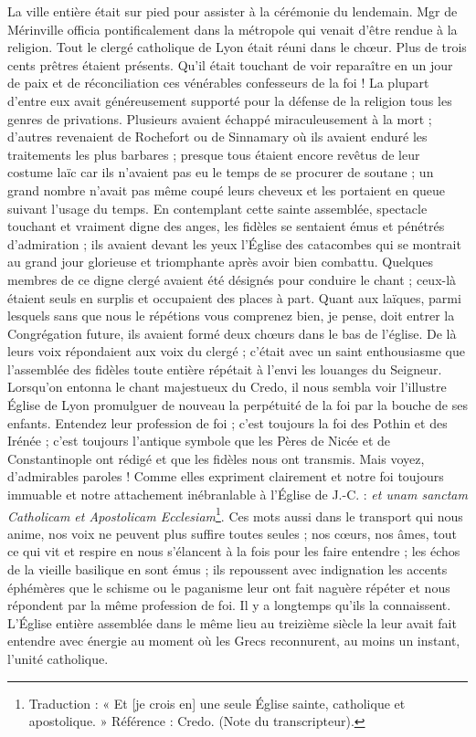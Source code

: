 La ville entière était sur pied pour assister à la cérémonie du lendemain. Mgr de Mérinville officia pontificalement dans la métropole qui venait d'être rendue à la religion. Tout le clergé catholique de Lyon était réuni dans le chœur. Plus de trois cents prêtres étaient présents. Qu'il était touchant de voir reparaître en un jour de paix et de réconciliation ces vénérables confesseurs de la foi ! La plupart d'entre eux avait généreusement supporté pour la défense de la religion tous les genres de privations. Plusieurs avaient échappé miraculeusement à la mort ; d'autres revenaient de Rochefort ou de Sinnamary où ils avaient enduré les traitements les plus barbares ; presque tous étaient encore revêtus de leur costume laïc car ils n'avaient pas eu le temps de se procurer de soutane ; un grand nombre n'avait pas même coupé leurs cheveux et les portaient en queue suivant l'usage du temps. En contemplant cette sainte assemblée, spectacle touchant et vraiment digne des anges, les fidèles se sentaient émus et pénétrés d'admiration ; ils avaient devant les yeux l'Église des catacombes qui se montrait au grand jour glorieuse et triomphante après avoir bien combattu. Quelques
membres de ce digne clergé avaient été désignés pour conduire le chant ; ceux-là étaient seuls en surplis et occupaient des places à part. Quant aux laïques, parmi lesquels sans que nous le répétions vous comprenez bien, je pense, doit entrer la Congrégation future, ils avaient formé deux chœurs dans le bas de l'église. De là leurs voix répondaient aux voix du clergé ; c'était avec un saint enthousiasme que l'assemblée des fidèles toute entière répétait à l'envi les louanges du Seigneur. Lorsqu'on entonna le chant majestueux du Credo, il nous sembla voir l'illustre Église de Lyon promulguer de nouveau la perpétuité de la foi par la bouche de ses enfants. Entendez leur profession de foi ; c'est toujours la foi des Pothin et des Irénée ; c'est toujours l'antique symbole que les Pères de Nicée et de Constantinople ont rédigé et que les fidèles nous ont transmis. Mais voyez, d'admirables paroles ! Comme elles expriment clairement et notre foi toujours immuable et notre attachement inébranlable à l'Église de J.-C. : \textit{et unam sanctam Catholicam et Apostolicam Ecclesiam}\footnote{Traduction : « Et [je crois en] une seule Église sainte, catholique et apostolique. » Référence : Credo. (Note du transcripteur).}. Ces mots aussi dans le transport qui nous anime, nos voix ne peuvent plus suffire toutes seules ; nos cœurs, nos âmes, tout ce qui vit et respire en nous s’élancent à la fois pour les faire entendre ; les échos de la vieille basilique en sont émus ; ils repoussent avec indignation les accents éphémères que le schisme ou le paganisme leur ont fait naguère répéter et nous répondent par la même profession de foi. Il y a
longtemps qu'ils la connaissent. L'Église entière assemblée dans le même lieu au treizième siècle la leur avait fait entendre avec énergie au moment où les Grecs reconnurent, au moins un instant, l'unité catholique.


